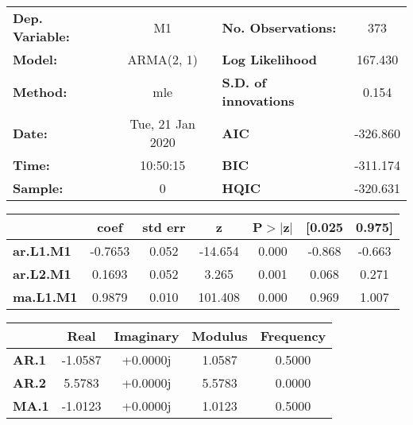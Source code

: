 \begin{center}
\begin{tabular}{lclc}
\toprule
\textbf{Dep. Variable:} &             M1            & \textbf{  No. Observations:  } &            373             \\
\textbf{Model:}         &         ARMA(2, 1)        & \textbf{  Log Likelihood     } &          167.430           \\
\textbf{Method:}        &            mle            & \textbf{  S.D. of innovations} &           0.154            \\
\textbf{Date:}          &      Tue, 21 Jan 2020     & \textbf{  AIC                } &          -326.860          \\
\textbf{Time:}          &          10:50:15         & \textbf{  BIC                } &          -311.174          \\
\textbf{Sample:}        &             0             & \textbf{  HQIC               } &          -320.631          \\
\bottomrule
\end{tabular}
\begin{tabular}{lcccccc}
                  & \textbf{coef} & \textbf{std err} & \textbf{z} & \textbf{P$>$$|$z$|$} & \textbf{[0.025} & \textbf{0.975]}  \\
\midrule
\textbf{ar.L1.M1} &      -0.7653  &        0.052     &   -14.654  &         0.000        &       -0.868    &       -0.663     \\
\textbf{ar.L2.M1} &       0.1693  &        0.052     &     3.265  &         0.001        &        0.068    &        0.271     \\
\textbf{ma.L1.M1} &       0.9879  &        0.010     &   101.408  &         0.000        &        0.969    &        1.007     \\
\bottomrule
\end{tabular}
\begin{tabular}{lcccc}
              & \textbf{            Real} & \textbf{         Imaginary} & \textbf{         Modulus} & \textbf{        Frequency}  \\
\midrule
\textbf{AR.1} &               -1.0587     &                +0.0000j     &                1.0587     &                0.5000       \\
\textbf{AR.2} &                5.5783     &                +0.0000j     &                5.5783     &                0.0000       \\
\textbf{MA.1} &               -1.0123     &                +0.0000j     &                1.0123     &                0.5000       \\
\bottomrule
\end{tabular}
\end{center}
